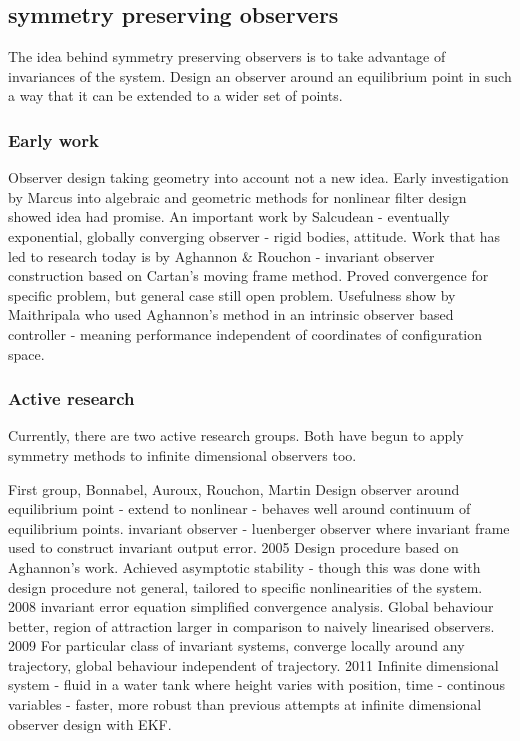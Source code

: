 \subsection{symmetry preserving observers}
The idea behind symmetry preserving observers is to take advantage of invariances of the system. Design an observer around an equilibrium point in such a way that it can be extended to a wider set of points.

\subsubsection{Early work}
Observer design taking geometry into account not a new idea. Early investigation by Marcus \cite{marcus1984algebraic} into algebraic and geometric methods for nonlinear filter design showed idea had promise.
An important work by Salcudean - eventually exponential, globally converging observer - rigid bodies, attitude.
Work that has led to research today is by Aghannon \& Rouchon \cite{aghannan2002invariant} - invariant observer construction based on Cartan's moving frame method. Proved convergence for specific problem, but general case still open problem.
Usefulness show by Maithripala \cite{maithripala2005intrinsic} who used Aghannon's method in an intrinsic observer based controller - meaning performance independent of coordinates of configuration space.


\subsubsection{Active research}
Currently, there are two active research groups. Both have begun to apply symmetry methods to infinite dimensional observers too.

First group, Bonnabel, Auroux, Rouchon, Martin
Design observer around equilibrium point - extend to nonlinear - behaves well around continuum of equilibrium points. 
invariant observer - luenberger observer where invariant frame used to construct invariant output error.
2005 \cite{bonnabel2005invariant} Design procedure based on Aghannon's work. Achieved asymptotic stability - though this was done with design procedure not general, tailored to specific nonlinearities of the system.
2008 \cite{bonnabel2008symmetry} invariant error equation simplified convergence analysis. Global behaviour better, region of attraction larger in comparison to naively linearised observers.
2009 \cite{bonnabel2009non} For particular class of invariant systems, converge locally around any trajectory, global behaviour independent of trajectory.
2011 \cite{auroux2011symmetry} Infinite dimensional system - fluid in a water tank where height varies with position, time - continous variables - faster, more robust than previous attempts at infinite dimensional observer design with EKF.

